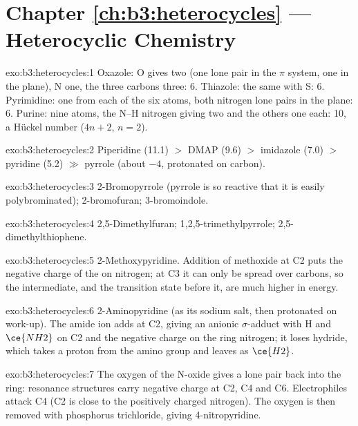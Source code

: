 \section*{Chapter \ref{ch:b3:heterocycles} --- Heterocyclic Chemistry}

\begin{solution}{exo:b3:heterocycles:1}
Oxazole: O gives two (one lone pair in the $\pi$ system, one in the plane), N one, the
three carbons three: 6. Thiazole: the same with S: 6. Pyrimidine: one from each
of the six atoms, both nitrogen lone pairs in the plane: 6. Purine: nine atoms,
the N--H nitrogen giving two and the others one each: 10, a Hückel number
($4n + 2$, $n = 2$).
\end{solution}

\begin{solution}{exo:b3:heterocycles:2}
Piperidine (11.1) $>$ DMAP (9.6) $>$ imidazole (7.0) $>$ pyridine (5.2) $\gg$ pyrrole (about $-4$,
protonated on carbon).
\end{solution}

\begin{solution}{exo:b3:heterocycles:3}
2-Bromopyrrole (pyrrole is so reactive that it is easily polybrominated);
2-bromofuran; 3-bromoindole.
\end{solution}

\begin{solution}{exo:b3:heterocycles:4}
2,5-Dimethylfuran; 1,2,5-trimethylpyrrole; 2,5-dimethylthiophene.
\end{solution}

\begin{solution}{exo:b3:heterocycles:5}
2-Methoxypyridine. Addition of methoxide at C2 puts the negative charge of the
 on nitrogen; at C3 it can only be spread over carbons, so the
intermediate, and the transition state before it, are much higher in energy.
\end{solution}

\begin{solution}{exo:b3:heterocycles:6}
2-Aminopyridine (as its sodium salt, then protonated on work-up). The amide ion
adds at C2, giving an anionic $\sigma$-adduct with H and $\ce{NH2}$ on C2 and the negative
charge on the ring nitrogen; it loses hydride, which takes a proton from the
amino group and leaves as $\ce{H2}$.
\end{solution}

\begin{solution}{exo:b3:heterocycles:7}
The oxygen of the N-oxide gives a lone pair back into the ring: resonance
structures carry negative charge at C2, C4 and C6. Electrophiles attack C4 (C2
is close to the positively charged nitrogen). The oxygen is then removed with
phosphorus trichloride, giving 4-nitropyridine.
\end{solution}


